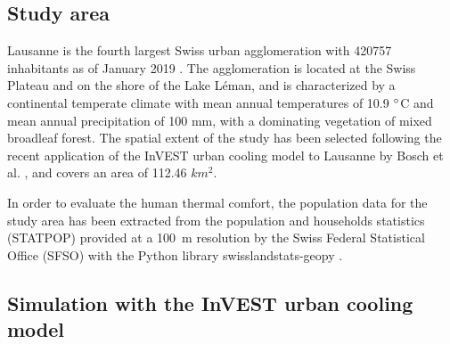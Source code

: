 \documentclass[10pt,letterpaper]{article}
\begin{document}
\subsection*{Study area}

Lausanne is the fourth largest Swiss urban agglomeration with 420757 inhabitants as of January 2019 \cite{sfso2018city}. The agglomeration is located at the Swiss Plateau and on the shore of the Lake L\'eman, and is characterized by a continental temperate climate with mean annual temperatures of 10.9 $\degree$C and mean annual precipitation of 100 mm, with a dominating vegetation of mixed broadleaf forest. The spatial extent of the study has been selected following the recent application of the InVEST urban cooling model to Lausanne by Bosch et al. \cite{bosch2020spatially}, and covers an area of 112.46 $km^2$.

In order to evaluate the human thermal comfort, the population data for the study area has been extracted from the population and households statistics (STATPOP) \cite{sfso2020statistique} provided at a 100~m resolution by the Swiss Federal Statistical Office (SFSO) with the Python library swisslandstats-geopy \cite{bosch2019swisslandstats}. 


\subsection*{Simulation with the InVEST urban cooling model}
\end{document}
